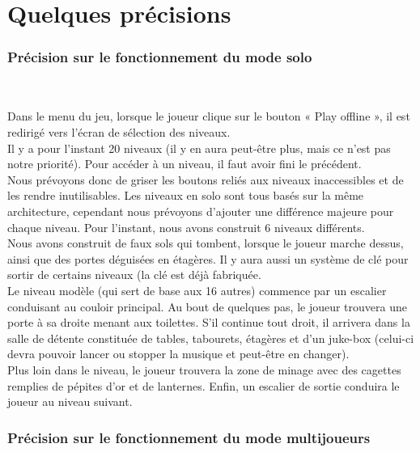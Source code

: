 \documentclass[titlepage, 13px, a4paper]{report}
\begin{document}
\part{Quelques précisions}

\section{Précision sur le fonctionnement du mode solo}
\paragraph{} \hspace{0pt} \\
Dans le menu du jeu, lorsque le joueur clique sur le bouton « Play offline », il est redirigé vers l'écran de sélection des niveaux. \\
Il y a pour l'instant 20 niveaux (il y en aura peut-être plus, mais ce n'est pas notre priorité). Pour accéder à un niveau, 
il faut avoir fini le précédent. \\
Nous prévoyons donc de griser les boutons reliés aux niveaux inaccessibles et de les rendre inutilisables. 
Les niveaux en solo sont tous basés sur la même architecture, cependant nous prévoyons d'ajouter une différence majeure pour chaque niveau. 
Pour l'instant, nous avons construit 6 niveaux différents. \\
Nous avons construit de faux sols qui tombent, lorsque le joueur marche dessus, 
ainsi que des portes déguisées en étagères. Il y aura aussi un système de clé pour sortir de certains niveaux (la clé est déjà fabriquée. \\
Le niveau modèle (qui  sert de base aux 16 autres) commence par un escalier conduisant au couloir principal. 
Au bout de quelques pas, le joueur trouvera une porte à sa droite menant aux toilettes.
S'il continue tout droit, il arrivera dans la salle de détente constituée de tables, tabourets, étagères et d'un juke-box 
(celui-ci devra pouvoir lancer ou stopper la musique et peut-être en changer). \\
Plus loin dans le niveau, le joueur trouvera la zone de minage avec des cagettes remplies de pépites d'or et de lanternes. 
Enfin, un escalier de sortie conduira le joueur au niveau suivant.


\section{Précision sur le fonctionnement du mode multijoueurs}
\end{document}
